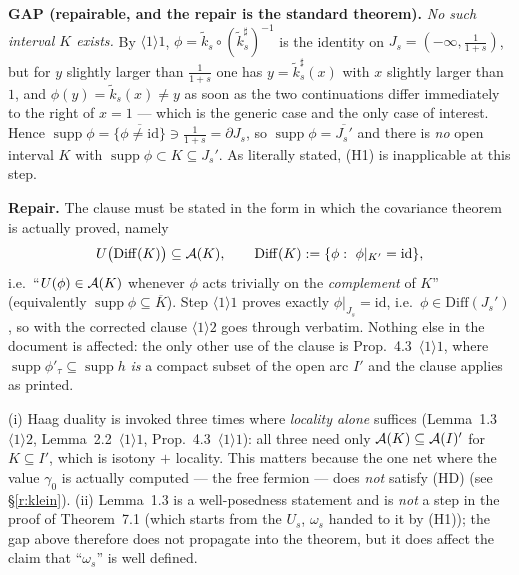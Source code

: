 \documentclass[11pt]{article}
\newcommand{\kt}{\widetilde k}
\newcommand{\supp}{\operatorname{supp}}
\begin{document}
\begin{verdictgap}
\textbf{GAP (repairable, and the repair is the standard theorem).}  \emph{No such interval $K$ exists.}
By $\langle1\rangle1$, $\phi=\kt_s\circ(\kt_s^\sharp)^{-1}$ is the identity on $J_s=(-\infty,\frac1{1+s})$,
but for $y$ slightly larger than $\frac1{1+s}$ one has $y=\kt^\sharp_s(x)$ with $x$ slightly larger than $1$,
and $\phi(y)=\kt_s(x)\ne y$ as soon as the two continuations differ immediately to the right of $x=1$ ---
which is the generic case and the only case of interest.  Hence
$\supp\phi=\overline{\{\phi\ne\mathrm{id}\}}\ni\frac1{1+s}=\partial J_s$, so
$\supp\phi=\overline{J_s'}$ and there is \emph{no} open interval $K$ with
$\supp\phi\subset K\subseteq J_s'$.  As literally stated, (H1) is inapplicable at this step.

\textbf{Repair.}  The clause must be stated in the form in which the covariance theorem is actually proved,
namely
\[
 U\bigl(\mathrm{Diff}(K)\bigr)\subseteq\mathcal A(K),\qquad
 \mathrm{Diff}(K):=\{\phi:\ \phi|_{K'}=\mathrm{id}\},
\]
i.e.\ ``$U(\phi)\in\mathcal A(K)$ whenever $\phi$ acts trivially on the \emph{complement} of $K$''
(equivalently $\supp\phi\subseteq\overline K$).  Step $\langle1\rangle1$ proves exactly
$\phi|_{J_s}=\mathrm{id}$, i.e.\ $\phi\in\mathrm{Diff}(J_s')$, so with the corrected clause
$\langle1\rangle2$ goes through verbatim.  Nothing else in the document is affected: the only other use of
the clause is Prop.~4.3~$\langle1\rangle1$, where $\supp\phi'_\tau\subseteq\supp h$ \emph{is} a compact
subset of the open arc $I'$ and the clause applies as printed.
\end{verdictgap}

\begin{remark}
(i) Haag duality is invoked three times where \emph{locality alone} suffices
(Lemma~1.3~$\langle1\rangle2$, Lemma~2.2~$\langle1\rangle1$, Prop.~4.3~$\langle1\rangle1$): all three need
only $\mathcal A(K)\subseteq\mathcal A(I)'$ for $K\subseteq I'$, which is isotony $+$ locality.  This matters because the
one net where the value $\gamma_0$ is actually computed --- the free fermion --- does \emph{not} satisfy
(HD) (see \S\ref{r:klein}).  (ii) Lemma~1.3 is a well-posedness statement and is \emph{not} a step in the
proof of Theorem~7.1 (which starts from the $U_s$, $\omega_s$ handed to it by (H1)); the gap above therefore
does not propagate into the theorem, but it does affect the claim that ``$\omega_s$'' is well defined.
\end{remark}
\end{document}
